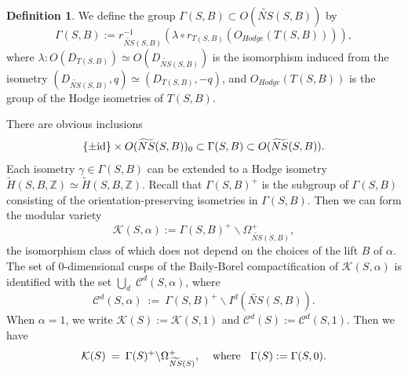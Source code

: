 \documentclass{article}
\theoremstyle{plain}
\theoremstyle{definition}
\newtheorem{definition}[theorem]{Definition}
\theoremstyle{remark}
\newcommand{\Z}{{\mathbb Z}}
\begin{document}
\begin{definition}
We define the group 
$\Gamma (S, B) \subset O(\widetilde{NS}(S, B))$ by 
\begin{equation*}
\Gamma (S, B) := 
r_{\widetilde{NS}(S, B)}^{-1} (\lambda \circ r_{T(S, B)}(O_{Hodge}(T(S, B)))), 
\end{equation*}
where 
$\lambda : O(D_{T(S, B)}) \simeq O(D_{\widetilde{NS}(S, B)})$ 
is the isomorphism 
induced from the isometry 
$(D_{\widetilde{NS}(S, B)}, q) \simeq (D_{T(S, B)}, -q)$, 
and 
$O_{Hodge}(T(S, B))$
is the group of the Hodge isometries of $T(S, B)$. 
\end{definition}








There are obvious inclusions 
\begin{equation*}\label{eqn:inclusions} 
\{ \pm {\rm id\/} \} \times O(\widetilde{NS}(S, B))_{0} 
\subset 
\Gamma (S, B)
\subset 
O(\widetilde{NS}(S, B)). 
\end{equation*}
Each isometry 
$\gamma \in \Gamma (S, B)$ 
can be extended to a Hodge isometry 
$\widetilde{H}(S, B, {\Z}) \simeq \widetilde{H}(S, B, {\Z})$. 
Recall that 
$\Gamma (S, B)^{+}$ 
is the subgroup of $\Gamma (S, B)$ 
consisting of the orientation-preserving isometries in $\Gamma (S, B)$. 
Then 
we can form the modular variety 
\begin{equation}\label{eqn:twisted Kahler moduli}
\mathcal{K} (S, \alpha ) := 
          \Gamma (S, B)^{+} \backslash \Omega _{\widetilde{NS}(S, B)}^{+},  
\end{equation}  
the isomorphism class of which 
does not depend on the choices of the lift $B$ of $\alpha $. 
The set of $0$-dimensional cusps of the Baily-Borel compactification of $\mathcal{K} (S, \alpha )$ 
is identified with the set 
$\mathop{\bigcup}_{d} \; \mathcal{C}^{d}(S, \alpha )$, 
where 
\begin{equation}\label{eqn:0-dim cusps of twisted Kahler moduli}
\mathcal{C}^{d}(S, \alpha ) \: := \: 
                                \Gamma (S, B)^{+} \backslash I^{d}(\widetilde{NS}(S, B)). 
\end{equation}
When 
$\alpha =1$, 
we write 
$\mathcal{K} (S) := \mathcal{K} (S, 1)$
and 
$\mathcal{C}^{d} (S) := \mathcal{C}^{d} (S, 1)$. 
Then we have 
\begin{equation}\label{eqn:Kahler moduli}
\mathcal{K}(S) \: = \: 
\Gamma (S)^{+} \backslash \Omega _{\widetilde{NS}(S)}^{+}, \: \: \: \: \: 
{\rm where\/} \: \: \: \: 
\Gamma (S) := \Gamma (S, 0). 
\end{equation}
\end{document}
